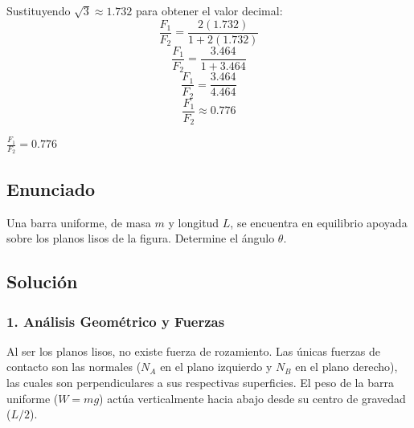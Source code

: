 \documentclass[12pt, a4paper]{article}
\begin{document}
Sustituyendo $\sqrt{3} \approx 1.732$ para obtener el valor decimal:
$$\frac{F_1}{F_2} = \frac{2(1.732)}{1 + 2(1.732)}$$
$$\frac{F_1}{F_2} = \frac{3.464}{1 + 3.464}$$
$$\frac{F_1}{F_2} = \frac{3.464}{4.464}$$
$$\frac{F_1}{F_2} \approx 0.776$$

\begin{tcolorbox}[colback=green!5!white, colframe=green!50!black, title=Respuesta Final]
\centering \Large $\frac{F_1}{F_2} = 0.776$
\end{tcolorbox}

\newpage

\subsection*{Enunciado}
Una barra uniforme, de masa $m$ y longitud $L$, se encuentra en equilibrio apoyada sobre los planos lisos de la figura. Determine el ángulo $\theta$.

\begin{center}
\end{center}

\subsection*{Solución}

\subsubsection*{1. Análisis Geométrico y Fuerzas}
Al ser los planos lisos, no existe fuerza de rozamiento. Las únicas fuerzas de contacto son las normales ($N_A$ en el plano izquierdo y $N_B$ en el plano derecho), las cuales son perpendiculares a sus respectivas superficies.
El peso de la barra uniforme ($W = mg$) actúa verticalmente hacia abajo desde su centro de gravedad ($L/2$).
\end{document}
